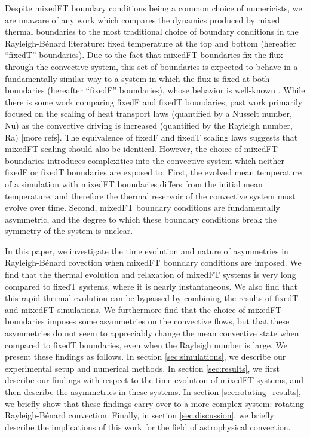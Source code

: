 \documentclass[aps, pre, onecolumn, nofootinbib, notitlepage, groupedaddress, amsfonts, amssymb, amsmath, longbibliography]{revtex4-1}
\newcommand{\RB}{Rayleigh-B\'{e}nard }
\begin{document}
Despite mixedFT boundary conditions being a common choice of numericists, we are unaware of any work which compares the dynamics produced by mixed thermal boundaries to the most traditional choice of boundary conditions in the \RB literature: fixed temperature at the top and bottom (hereafter ``fixedT'' boundaries).
Due to the fact that mixedFT boundaries fix the flux through the convective system, this set of boundaries is expected to behave in a fundamentally similar way to a system in which the flux is fixed at both boundaries (hereafter ``fixedF'' boundaries), whose behavior is well-known \cite{otero&all2002, goluskin2015}.
While there is some work \cite{johnston&doering2009} comparing fixedF and fixedT boundaries, past work primarily focused on the scaling of heat transport laws (quantified by a Nusselt number, Nu) as the convective driving is increased (quantified by the Rayleigh number, Ra) [more refs].
The equivalence of fixedF and fixedT scaling laws suggests that mixedFT scaling should also be identical.
However, the choice of mixedFT boundaries introduces complexities into the convective system which neither fixedF or fixedT boundaries are exposed to.
First, the evolved mean temperature of a simulation with mixedFT boundaries differs from the initial mean temperature, and therefore the thermal reservoir of the convective system must evolve over time.
Second, mixedFT boundary conditions are fundamentally asymmetric, and the degree to which these boundary conditions break the symmetry of the system is unclear.

In this paper, we investigate the time evolution and nature of asymmetries in \RB covection when mixedFT boundary conditions are imposed.
We find that the thermal evolution and relaxation of mixedFT systems is very long compared to fixedT systems, where it is nearly instantaneous.
We also find that this rapid thermal evolution can be bypassed by combining the results of fixedT and mixedFT simulations.
We furthermore find that the choice of mixedFT boundaries imposes some asymmetries on the convective flows, but that these asymmetries do not seem to appreciably change the mean convective state when compared to fixedT boundaries, even when the Rayleigh number is large.
We present these findings as follows.
In section \ref{sec:simulations}, we describe our experimental setup and numerical methods.
In section \ref{sec:results}, we first describe our findings with respect to the time evolution of mixedFT systems, and then describe the asymmetries in these systems.
In section \ref{sec:rotating_results}, we briefly show that these findings carry over to a more complex system: rotating \RB convection.
Finally, in section \ref{sec:discussion}, we briefly describe the implications of this work for the field of astrophysical convection.
\end{document}
